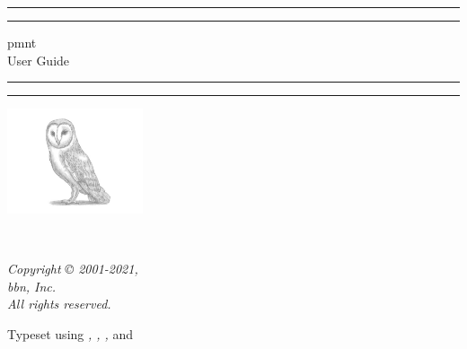 
\begin{titlepage}
	\centering

	\vspace*{\baselineskip}

	\rule{\textwidth}{1.6pt}\vspace*{-\baselineskip}\vspace*{2pt}
	\rule{\textwidth}{0.4pt}

	\vspace{0.75\baselineskip}

	{\LARGE\acl{pmnt}\\User Guide\\}

	\vspace{0.75\baselineskip}

	\rule{\textwidth}{0.4pt}\vspace*{-\baselineskip}\vspace{3.2pt}
	\rule{\textwidth}{1.6pt}

	\vspace{2\baselineskip}

	\includegraphics[width=0.3\textwidth]{includes/BarnOwl.jpeg}

	\vspace*{4\baselineskip}

	{\Large\theauthor\\}

	\vspace{0.5\baselineskip}

	\textit{\thedate}

	\vfill

	\textit{Copyright © 2001-2021,\\
	\acl{bbn}, Inc.\\
	All rights reserved.}

	{\footnotesize Typeset using \emph{\mainfont, \sansfont, \monofont,} and \emph{\mathfont}}
\end{titlepage}
\tableofcontents
\listoffigures
\listoftables
